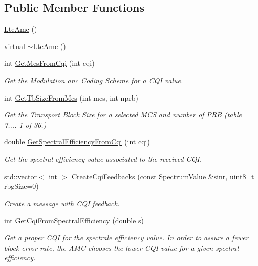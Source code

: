 \subsection*{Public Member Functions}
\begin{DoxyCompactItemize}
\item 
\hyperlink{classns3_1_1LteAmc_a2d70cf62cc2cf0fe3499d1627e6951de}{Lte\+Amc} ()
\item 
virtual \hyperlink{classns3_1_1LteAmc_a7771ccb1b86c158a1c56832d44542c51}{$\sim$\+Lte\+Amc} ()
\item 
int \hyperlink{classns3_1_1LteAmc_a434c1dbb812eee7d1a7fdfab215119a6}{Get\+Mcs\+From\+Cqi} (int cqi)
\begin{DoxyCompactList}\small\item\em Get the Modulation anc Coding Scheme for a C\+QI value. \end{DoxyCompactList}\item 
int \hyperlink{classns3_1_1LteAmc_affe1f434d32dd7aaa565c863b0f893c1}{Get\+Tb\+Size\+From\+Mcs} (int mcs, int nprb)
\begin{DoxyCompactList}\small\item\em Get the Transport Block Size for a selected M\+CS and number of P\+RB (table 7....-\/1 of 36.) \end{DoxyCompactList}\item 
double \hyperlink{classns3_1_1LteAmc_a9c50a41b117215168eee2364c7da8084}{Get\+Spectral\+Efficiency\+From\+Cqi} (int cqi)
\begin{DoxyCompactList}\small\item\em Get the spectral efficiency value associated to the received C\+QI. \end{DoxyCompactList}\item 
std\+::vector$<$ int $>$ \hyperlink{classns3_1_1LteAmc_a5190b24fd9a520be9be4a0d4d9110cf4}{Create\+Cqi\+Feedbacks} (const \hyperlink{classns3_1_1SpectrumValue}{Spectrum\+Value} \&sinr, uint8\+\_\+t rbg\+Size=0)
\begin{DoxyCompactList}\small\item\em Create a message with C\+QI feedback. \end{DoxyCompactList}\item 
int \hyperlink{classns3_1_1LteAmc_a14df653ff95e9941444a956a414aaf5a}{Get\+Cqi\+From\+Spectral\+Efficiency} (double \hyperlink{generate__test__data__lte__sinr_8m_ad83eeb3a142285d1243a08c6b7026df8}{s})
\begin{DoxyCompactList}\small\item\em Get a proper C\+QI for the spectrale efficiency value. In order to assure a fewer block error rate, the A\+MC chooses the lower C\+QI value for a given spectral efficiency. \end{DoxyCompactList}\end{DoxyCompactItemize}
